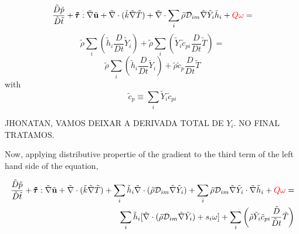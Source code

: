 \documentclass[preprint,12pt,authoryear]{elsarticle}
\begin{document}
{\color{red}
\[
        \frac{\tilde{D} \tilde{p}}{\tilde{D}\tilde{t}}
        +       
        \pmb{\tilde{\tau}}:\tilde{\nabla} \tilde{\mathbf{u}} 
        + 
        \tilde{\nabla} \cdot (\tilde{k}\tilde{\nabla} \tilde{T})
        +
        \tilde{\nabla} \cdot
        \sum\limits_i 
        \tilde{\rho}\mathcal{D}_{im}\tilde{\nabla}\tilde{Y}_i     
        \tilde{h}_i
        +
        {\color{red} Q\omega}
        =
\]
\[
         \tilde{\rho}
        \sum\limits_i
        \left(
                \tilde{h}_i
                \frac{D}{Dt}
		\tilde{Y}_i
		\right)
                +
        \tilde{\rho}
        \sum\limits_i
        \left(
                \tilde{Y}_i
                \tilde{c}_{pi}
                \frac{D}{Dt}
		\tilde{T}
        \right)
        =
\]
\[
         \tilde{\rho}
         \sum\limits_i
        \left(
                \tilde{h}_i
                \frac{D}{Dt}
		\tilde{Y}_i
		\right)
                +
                 \tilde{\rho} \tilde{c}_{p}
                \frac{D}{Dt}
		\tilde{T}
\]
with
\[
     \tilde{c}_p \equiv \sum\limits_i \tilde{Y}_i \tilde{c}_{pi}
\]

JHONATAN, VAMOS DEIXAR A DERIVADA TOTAL DE $Y_i$. NO FINAL TRATAMOS.
}

Now, applying distributive propertie of the gradient to the third term  of the left hand side of the equation, 

\begin{equation}
\begin{split}
        \frac{\tilde{D} \tilde{p}}{\tilde{D}\tilde{t}}
        +       
        \pmb{\tilde{\tau}}:\tilde{\nabla} \tilde{\mathbf{u}} 
        + 
        \tilde{\nabla} \cdot (\tilde{k}\tilde{\nabla} \tilde{T})
        +
        \sum\limits_i
        \tilde{h}_i
        \tilde{\nabla}\cdot
	(
	\tilde{\rho}\mathcal{D}_{im}\tilde{\nabla}\tilde{Y}_i
	)
        +
        \sum\limits_i 
        \tilde{\rho}
        \mathcal{D}_{im}
        \tilde{\nabla}
        \tilde{Y}_i     
        \cdot
        \tilde{\nabla} 
        \tilde{h}_i
        +
        {\color{red} Q\omega}
        =
\\
        \sum\limits_i
        \tilde{h}_i
        [
        	\tilde{\nabla}\cdot
		(
		\tilde{\rho}\mathcal{D}_{im}\tilde{\nabla}\tilde{Y}_i
		)
		+
        	s_i \omega
	    ]
        +
        \sum\limits_i
        \left(
                \tilde{\rho}
                \tilde{Y}_i
                \tilde{c}_{pi}
                \frac{\tilde{D}}{\tilde{D} t}
                \tilde{T}
        \right)
\end{split}
\end{equation}
\end{document}
